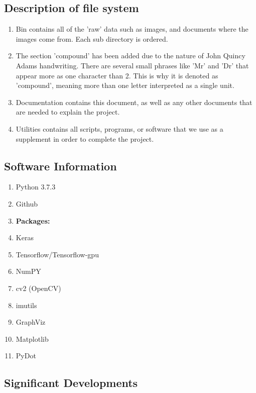 \documentclass[12pt]{article} %
\begin{document}
\subsection{Description of file system}
\begin{enumerate}[label = (\roman*)]
\item Bin contains all of the 'raw' data such as images, and documents where the images come from. Each sub directory is ordered.
\item The section 'compound' has been added due to the nature of John Quincy Adams handwriting. There are several small phrases like 'Mr' and 'Dr' that appear more as one character than 2. This is why it is denoted as 'compound', meaning more than one letter interpreted as a single unit.
\item Documentation contains this document, as well as any other documents that are needed to explain the project.
\item Utilities contains all scripts, programs, or software that we use as a supplement in order to complete the project.
\end{enumerate}

\subsection{Software Information}
\begin{enumerate}[label = (\roman*)]
\item Python 3.7.3
\item Github
\item \textbf{Packages:}
\item Keras
\item Tensorflow/Tensorflow-gpu
\item NumPY
\item cv2 (OpenCV)
\item imutils
\item GraphViz
\item Matplotlib
\item PyDot
\end{enumerate}

\subsection{Significant Developments}
\end{document}
